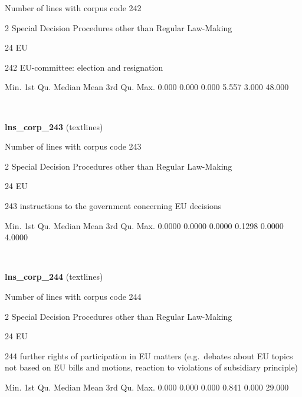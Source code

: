 \documentclass[]{article}
\newenvironment{Shaded}{\begin{snugshade}}{\end{snugshade}}
\newcommand{\FloatTok}[1]{\textcolor[rgb]{0.00,0.00,0.81}{{#1}}}
\newcommand{\NormalTok}[1]{{#1}}
\begin{document}
Number of lines with corpus code 242

2 Special Decision Procedures other than Regular Law-Making

24 EU

242 EU-committee: election and resignation

\begin{Shaded}
\begin{Highlighting}[]
   \NormalTok{Min. 1st Qu.  Median    Mean 3rd Qu.    Max. }
  \FloatTok{0.000}   \FloatTok{0.000}   \FloatTok{0.000}   \FloatTok{5.557}   \FloatTok{3.000}  \FloatTok{48.000} 
\end{Highlighting}
\end{Shaded}

~

\vspace{1em}

\textbf{lns\_corp\_243} (textlines)

Number of lines with corpus code 243

2 Special Decision Procedures other than Regular Law-Making

24 EU

243 instructions to the government concerning EU decisions

\begin{Shaded}
\begin{Highlighting}[]
   \NormalTok{Min. 1st Qu.  Median    Mean 3rd Qu.    Max. }
 \FloatTok{0.0000}  \FloatTok{0.0000}  \FloatTok{0.0000}  \FloatTok{0.1298}  \FloatTok{0.0000}  \FloatTok{4.0000} 
\end{Highlighting}
\end{Shaded}

~

\vspace{1em}

\textbf{lns\_corp\_244} (textlines)

Number of lines with corpus code 244

2 Special Decision Procedures other than Regular Law-Making

24 EU

244 further rights of participation in EU matters (e.g.~debates about EU
topics not based on EU bills and motions, reaction to violations of
subsidiary principle)

\begin{Shaded}
\begin{Highlighting}[]
   \NormalTok{Min. 1st Qu.  Median    Mean 3rd Qu.    Max. }
  \FloatTok{0.000}   \FloatTok{0.000}   \FloatTok{0.000}   \FloatTok{0.841}   \FloatTok{0.000}  \FloatTok{29.000} 
\end{Highlighting}
\end{Shaded}
\end{document}
